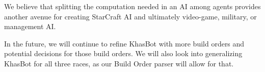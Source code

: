 \documentclass[letterpaper]{article}
\begin{document}
We believe that splitting the computation needed in an AI among agents provides another avenue for creating StarCraft AI and ultimately video-game, military, or management AI.

In the future, we will continue to refine KhasBot with more build orders and potential decisions for those build orders.  We will also look into generalizing KhasBot for all three races, as our Build Order parser will allow for that.

{}

\end{document}
